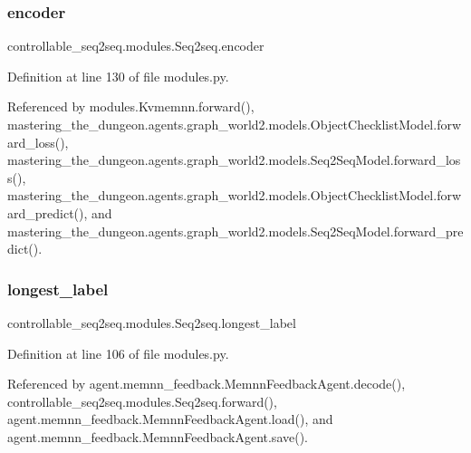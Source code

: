 \subsubsection{\texorpdfstring{encoder}{encoder}}
{\footnotesize\ttfamily controllable\+\_\+seq2seq.\+modules.\+Seq2seq.\+encoder}



Definition at line 130 of file modules.\+py.



Referenced by modules.\+Kvmemnn.\+forward(), mastering\+\_\+the\+\_\+dungeon.\+agents.\+graph\+\_\+world2.\+models.\+Object\+Checklist\+Model.\+forward\+\_\+loss(), mastering\+\_\+the\+\_\+dungeon.\+agents.\+graph\+\_\+world2.\+models.\+Seq2\+Seq\+Model.\+forward\+\_\+loss(), mastering\+\_\+the\+\_\+dungeon.\+agents.\+graph\+\_\+world2.\+models.\+Object\+Checklist\+Model.\+forward\+\_\+predict(), and mastering\+\_\+the\+\_\+dungeon.\+agents.\+graph\+\_\+world2.\+models.\+Seq2\+Seq\+Model.\+forward\+\_\+predict().

\mbox{\label{classcontrollable__seq2seq_1_1modules_1_1Seq2seq_a644daa8d07b032b4787c42df2bdcca51}} 
\subsubsection{\texorpdfstring{longest\+\_\+label}{longest\_label}}
{\footnotesize\ttfamily controllable\+\_\+seq2seq.\+modules.\+Seq2seq.\+longest\+\_\+label}



Definition at line 106 of file modules.\+py.



Referenced by agent.\+memnn\+\_\+feedback.\+Memnn\+Feedback\+Agent.\+decode(), controllable\+\_\+seq2seq.\+modules.\+Seq2seq.\+forward(), agent.\+memnn\+\_\+feedback.\+Memnn\+Feedback\+Agent.\+load(), and agent.\+memnn\+\_\+feedback.\+Memnn\+Feedback\+Agent.\+save().

\mbox{\label{classcontrollable__seq2seq_1_1modules_1_1Seq2seq_a53c2e1a8a5839edfe73c422f4c1b6ffe}} 
